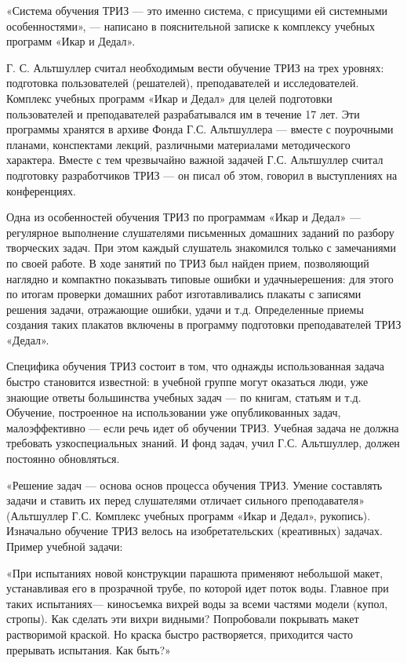 «Система обучения ТРИЗ — это именно система, с присущими ей системными
особенностями», — написано в пояснительной записке к комплексу учебных
программ «Икар и Дедал».

Г.  С.  Альтшуллер считал  необходимым  вести  обучение ТРИЗ  на  трех
уровнях:  подготовка   пользователей  (решателей),   преподавателей  и
исследователей.  Комплекс учебных  программ «Икар  и Дедал»  для целей
подготовки пользователей и преподавателей  разрабатывался им в течение
17  лет.  Эти  программы  хранятся в  архиве  Фонда  Г.С.  Альтшуллера
—  вместе   с  поурочными  планами,  конспектами   лекций,  различными
материалами методического  характера. Вместе с тем  чрезвычайно важной
задачей  Г.С. Альтшуллер  считал  подготовку разработчиков  ТРИЗ —  он
писал об этом, говорил в выступлениях на конференциях.

Одна  из особенностей  обучения ТРИЗ  по программам  «Икар и  Дедал» —
регулярное  выполнение  слушателями  письменных  домашних  заданий  по
разбору творческих задач. При  этом каждый слушатель знакомился только
с  замечаниями по  своей работе.  В ходе  занятий по  ТРИЗ был  найден
прием,  позволяющий наглядно  и  компактно  показывать типовые  ошибки
и  удачныерешения:  для  этого   по  итогам  проверки  домашних  работ
изготавливались плакаты с записями  решения задачи, отражающие ошибки,
удачи и  т.д. Определенные приемы  создания таких плакатов  включены в
программу подготовки преподавателей ТРИЗ «Дедал».

Специфика  обучения ТРИЗ  состоит  в том,  что однажды  использованная
задача   быстро  становится   известной:   в   учебной  группе   могут
оказаться  люди, уже  знающие ответы  большинства учебных  задач —  по
книгам,  статьям и  т.д.  Обучение, построенное  на использовании  уже
опубликованных  задач, малоэффективно  —  если речь  идет об  обучении
ТРИЗ.  Учебная задача  не должна  требовать узкоспециальных  знаний. И
фонд задач, учил Г.С. Альтшуллер, должен постоянно обновляться.

«Решение  задач   —  основа  основ  процесса   обучения  ТРИЗ.  Умение
составлять  задачи и  ставить их  перед слушателями  отличает сильного
преподавателя»  (Альтшуллер Г.С.  Комплекс  учебных  программ «Икар  и
Дедал», рукопись). Изначально обучение ТРИЗ велось на изобретательских
(креативных) задачах. Пример учебной задачи:

«При испытаниях новой конструкции  парашюта применяют небольшой макет,
устанавливая  его в  прозрачной  трубе, по  которой  идет поток  воды.
Главное при таких испытаниях— киносъемка  вихрей воды за всеми частями
модели  (купол, стропы).  Как сделать  эти вихри  видными? Попробовали
покрывать макет  растворимой краской.  Но краска  быстро растворяется,
приходится часто прерывать испытания. Как быть?»

